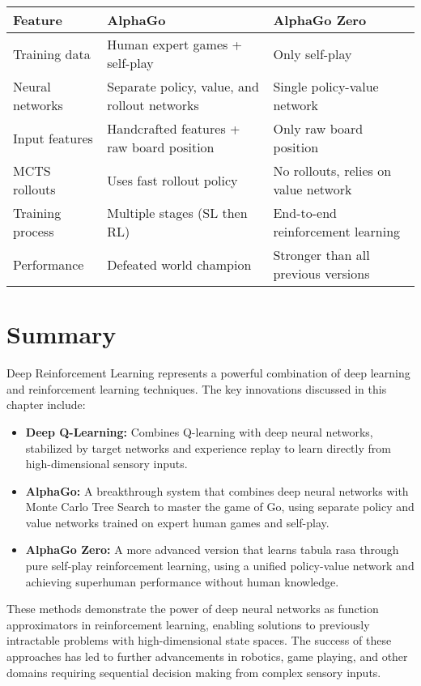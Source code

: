 \documentclass[11pt]{article}
\begin{document}
\begin{tabular}{|p{5cm}|p{5cm}|p{5cm}|}
\hline
\textbf{Feature} & \textbf{AlphaGo} & \textbf{AlphaGo Zero} \\
\hline
Training data & Human expert games + self-play & Only self-play \\
\hline
Neural networks & Separate policy, value, and rollout networks & Single policy-value network \\
\hline
Input features & Handcrafted features + raw board position & Only raw board position \\
\hline
MCTS rollouts & Uses fast rollout policy & No rollouts, relies on value network \\
\hline
Training process & Multiple stages (SL then RL) & End-to-end reinforcement learning \\
\hline
Performance & Defeated world champion & Stronger than all previous versions \\
\hline
\end{tabular}

\section{Summary}

Deep Reinforcement Learning represents a powerful combination of deep learning and reinforcement learning techniques. The key innovations discussed in this chapter include:

\begin{itemize}
    \item \textbf{Deep Q-Learning:} Combines Q-learning with deep neural networks, stabilized by target networks and experience replay to learn directly from high-dimensional sensory inputs.
    
    \item \textbf{AlphaGo:} A breakthrough system that combines deep neural networks with Monte Carlo Tree Search to master the game of Go, using separate policy and value networks trained on expert human games and self-play.
    
    \item \textbf{AlphaGo Zero:} A more advanced version that learns tabula rasa through pure self-play reinforcement learning, using a unified policy-value network and achieving superhuman performance without human knowledge.
\end{itemize}

These methods demonstrate the power of deep neural networks as function approximators in reinforcement learning, enabling solutions to previously intractable problems with high-dimensional state spaces. The success of these approaches has led to further advancements in robotics, game playing, and other domains requiring sequential decision making from complex sensory inputs.
\end{document}
